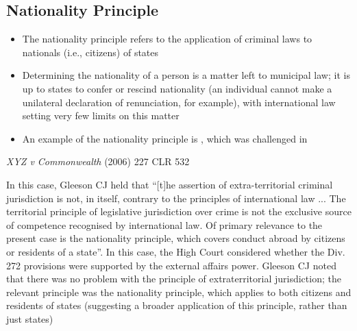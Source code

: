 \subsection{Nationality Principle}
\begin{itemize}
    \item The nationality principle refers to the application of criminal laws to nationals (i.e., citizens) of states
    \item Determining the nationality of a person is a matter left to municipal law; it is up to states to confer or rescind nationality (an individual cannot make a unilateral declaration of renunciation, for example), with international law setting very few limits on this matter
    \item An example of the nationality principle is , which was challenged in 
\end{itemize}
\begin{casedetails}{\textit{XYZ v Commonwealth} (2006) 227 CLR 532}
    
        \flushleft
        
        In this case, Gleeson CJ held that ``[t]he assertion of extra-territorial criminal jurisdiction is not, in itself, contrary to the principles of international law ... The territorial principle of legislative jurisdiction over crime is not the exclusive source of competence recognised by international law. Of primary relevance to the present case is the nationality principle, which covers conduct abroad by citizens or residents of a state''. In this case, the High Court considered whether the Div. 272 provisions were supported by the external affairs power. Gleeson CJ noted that there was no problem with the principle of extraterritorial jurisdiction; the relevant principle was the nationality principle, which applies to both citizens and residents of states (suggesting a broader application of this principle, rather than just states)
    \end{casedetails}

